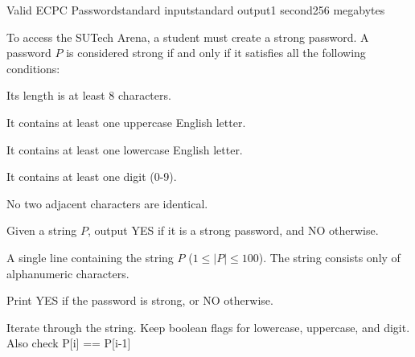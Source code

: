 \begin{problem}{Valid ECPC Password}{standard input}{standard output}{1 second}{256 megabytes}

To access the SUTech Arena, a student must create a strong password. A password $P$ is considered strong if and only if it satisfies all the following conditions:

Its length is at least 8 characters.

It contains at least one uppercase English letter.

It contains at least one lowercase English letter.

It contains at least one digit (0-9).

No two adjacent characters are identical.

Given a string $P$, output YES if it is a strong password, and NO otherwise.

\InputFile
A single line containing the string $P$ ($1 \le |P| \le 100$). The string consists only of alphanumeric characters.

\OutputFile
Print YES if the password is strong, or NO otherwise.

\Examples

\begin{example}
%
%
\end{example}

\Note
Iterate through the string. Keep boolean flags for lowercase, uppercase, and digit. Also check P[i] == P[i-1]

\end{problem}

